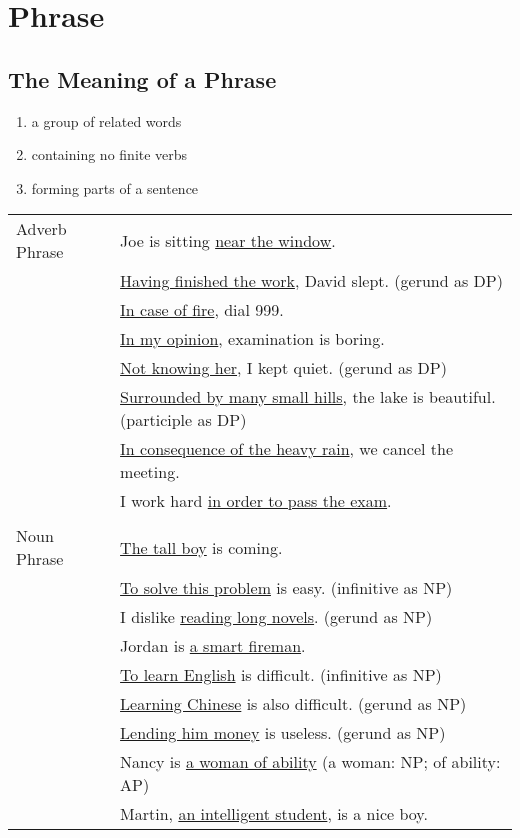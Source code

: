 \section{Phrase}

\subsection{The Meaning of a Phrase}
\begin{enumerate}
    \item a group of related words
    \item containing no finite verbs
    \item forming parts of a sentence
\end{enumerate}

\begin{tabular}{ll}
    Adverb Phrase 
    & Joe is sitting \underline{near the window}. \\
    & \underline{Having finished the work}, David slept. (gerund as DP)\\
    & \underline{In case of fire}, dial 999. \\
    & \underline{In my opinion}, examination is boring. \\
    & \underline{Not knowing her}, I kept quiet. (gerund as DP) \\
    & \underline{Surrounded by many small hills}, the lake is beautiful.
    (participle as DP)\\
    & \underline{In consequence of the heavy rain}, we cancel the meeting. \\
    & I work hard \underline{in order to pass the exam}. \\ \\
    Noun Phrase
    & \underline{The tall boy} is coming. \\
    & \underline{To solve this problem} is easy. (infinitive as NP) \\
    & I dislike \underline{reading long novels}. (gerund as NP) \\
    & Jordan is \underline{a smart fireman}. \\
    & \underline{To learn English} is difficult. (infinitive as NP) \\
    & \underline{Learning Chinese} is also difficult. (gerund as NP) \\
    & \underline{Lending him money} is useless. (gerund as NP) \\
    & Nancy is \underline{a woman of ability} (a woman: NP; of ability: AP) \\
    & Martin, \underline{an intelligent student}, is a nice boy.
\end{tabular}

